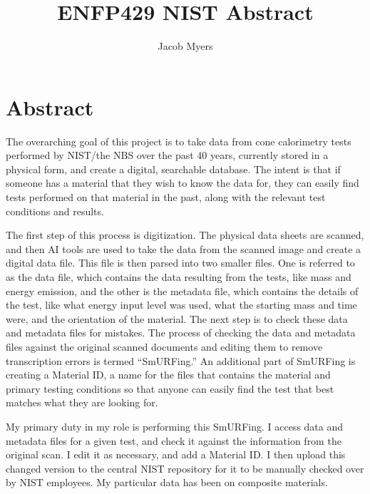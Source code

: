 \documentclass{abstract}
\title{ENFP429 NIST Abstract}
\author{Jacob Myers}
\begin{document}
\maketitle
\section{Abstract}

The overarching goal of this project is to take data from cone calorimetry tests performed by NIST/the NBS over the past 40 years, currently stored in a physical form, and create a digital, searchable database. The intent is that if someone has a material that they wish to know the data for, they can easily find tests performed on that material in the past, along with the relevant test conditions and results.  


The first step of this process is digitization. The physical data sheets are scanned, and then AI tools are used to take the data from the scanned image and create a digital data file. This file is then parsed into two smaller files. One is referred to as the data file, which contains the data resulting from the tests, like mass and energy emission, and the other is the metadata file, which contains the details of the test, like what energy input level was used, what the starting mass and time were, and the orientation of the material. The next step is to check these data and metadata files for mistakes. The process of checking the data and metadata files against the original scanned documents and editing them to remove transcription errors is termed “SmURFing.” An additional part of SmURFing is creating a Material ID, a name for the files that contains the material and primary testing conditions so that anyone can easily find the test that best matches what they are looking for.


My primary duty in my role is performing this SmURFing. I access data and metadata files for a given test, and check it against the information from the original scan. I edit it as necessary, and add a Material ID. I then upload this changed version to the central NIST repository for it to be manually checked over by NIST employees. My particular data has been on composite materials. 
\end{document}
